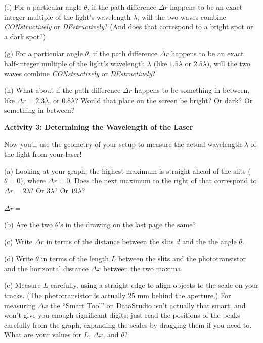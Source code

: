 (f) For a particular angle $\theta$, if the path difference $\Delta r$ happens to be an exact integer multiple of the light's wavelength $\lambda$, will the two waves combine \textit{CONstructively} or \textit{DEstructively}?  (And does that correspond to a bright spot or a dark spot?)
\answerspace{0.5in}

(g) For a particular angle $\theta$, if the path difference $\Delta r$ happens to be an exact half-integer multiple of the light's wavelength $\lambda$ (like $1.5\lambda$ or $2.5\lambda$), will the two waves combine \textit{CONstructively} or \textit{DEstructively}?
\answerspace{0.5in}

(h) What about if the path difference $\Delta r$ happens to be something in between, like $\Delta r = 2.3\lambda$, or $0.8\lambda$? Would that place on the screen be bright? Or dark? Or something in between?
\answerspace{0.5in}

\pagebreak[2]
\textbf{Activity 3: Determining the Wavelength of the Laser }

Now you'll use the geometry of your setup to measure the actual wavelength $\lambda$ of the light from your laser!

(a) Looking at your graph, the highest maximum is straight ahead of the slits ($\theta=0$), where $\Delta r=0$.  Does the next maximum to the right of that correspond to $\Delta r=2\lambda$?  Or $3\lambda$?  Or $19\lambda$?

\vspace{0.1in}
\hspace{0.8in}$\Delta r=$
\vspace{0.1in}

(b) Are the two $\theta$'s in the drawing on the last page the same?
\answerspace{0.3in}

(c) Write $\Delta r$ in terms of the distance between the slits $d$ and the the angle $\theta$.
\answerspace{0.5in}

(d) Write $\theta$ in terms of the length $L$ between the slits and the phototransistor and the horizontal distance $\Delta x$ between the two maxima.
\answerspace{0.5in}

(e) Measure $L$ carefully, using a straight edge to align objects to the scale on your tracks.  (The phototransistor is actually 25 mm behind the aperture.)  For measuring $\Delta x$ the ``Smart Tool'' on DataStudio isn't actually that smart, and won't give you enough significant digits; just read the positions of the peaks carefully from the graph, expanding the scales by dragging them if you need to.  What are your values for $L$, $\Delta x$, and $\theta$?
\answerspace{0.8in}

